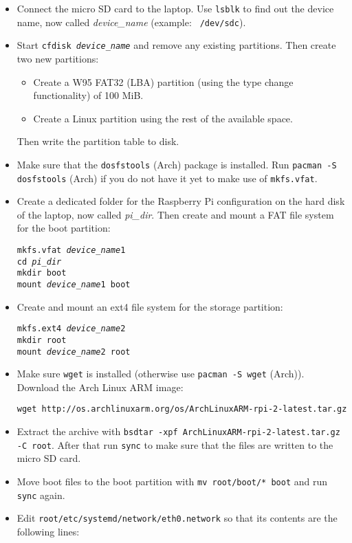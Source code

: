 \documentclass{article}
\newcommand{\arch}{{\color{red} (Arch)}}
\begin{document}
\begin{itemize}
    \item Connect the micro SD card to the laptop. Use {\tt lsblk} to find out 
          the device name, now called \emph{device\_name} (example: {\tt 
          /dev/sdc}).
    \item Start {\tt cfdisk \emph{device\_name}} and remove any existing 
          partitions. Then create two new partitions:
          \begin{itemize}
              \item Create a W95 FAT32 (LBA) partition (using the type change 
                    functionality) of 100 MiB.
              \item Create a Linux partition using the rest of the available 
                    space.
          \end{itemize}
          Then write the partition table to disk.
    \item Make sure that the {\tt dosfstools} \arch{} package is installed.  
          Run {\tt pacman -S dosfstools} \arch{} if you do not have it yet to 
          make use of {\tt mkfs.vfat}.
    \item Create a dedicated folder for the Raspberry Pi configuration on the 
          hard disk of the laptop, now called \emph{pi\_dir}.
          Then create and mount a FAT file system for the boot partition:

          {\tt mkfs.vfat \emph{device\_name}1} \\
          {\tt cd \emph{pi\_dir}} \\
          {\tt mkdir boot} \\
          {\tt mount \emph{device\_name}1 boot}
    \item Create and mount an ext4 file system for the storage partition:

          {\tt mkfs.ext4 \emph{device\_name}2} \\
          {\tt mkdir root} \\
          {\tt mount \emph{device\_name}2 root}
    \item Make sure {\tt wget} is installed (otherwise use {\tt pacman -S wget} 
          \arch{}). Download the Arch Linux ARM image:

          {\tt wget 
          http://os.archlinuxarm.org/os/ArchLinuxARM-rpi-2-latest.tar.gz}
    \item Extract the archive with {\tt bsdtar -xpf 
          ArchLinuxARM-rpi-2-latest.tar.gz -C root}. After that run {\tt sync} 
          to make sure that the files are written to the micro SD card.
    \item Move boot files to the boot partition with {\tt mv root/boot/* boot} 
          and run {\tt sync} again.
    \item Edit {\tt root/etc/systemd/network/eth0.network} so that its contents 
          are the following lines:


\end{itemize}
\end{document}
